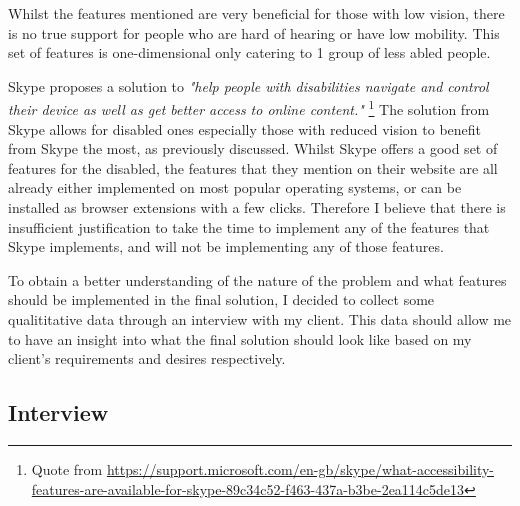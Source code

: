 \vspace{0.2cm}

Whilst the features mentioned are very beneficial for those 
with low vision, there is no true support for people who are
hard of hearing or have low mobility. This set of features is 
one-dimensional only catering to 1 group of less abled people.

\vspace{0.2cm}

Skype proposes a solution to \textit{"help people with 
disabilities navigate and control their device as well as get
better access to online content."} 
\footnote{Quote from \url{https://support.microsoft.com/en-gb/skype/what-accessibility-features-are-available-for-skype-89c34c52-f463-437a-b3be-2ea114c5de13}}
The solution from Skype allows for disabled ones especially 
those with reduced vision to benefit from Skype the most, as 
previously discussed. Whilst Skype offers a good set of
features for the disabled, the features that they mention on 
their website are all already either implemented on most 
popular operating systems, or can be installed as browser 
extensions with a few clicks. Therefore I believe that there is
insufficient justification to take the time to implement any 
of the features that Skype implements, and will not be 
implementing any of those features.

\vspace{0.2cm}

To obtain a better understanding of the nature of the problem
and what features should be implemented in the final solution,
I decided to collect some qualititative data through an 
interview with my client. This data should allow me to have an
insight into what the final solution should look like based
on my client's requirements and desires respectively.

\subsection{Interview}
\label{sec:interview}

